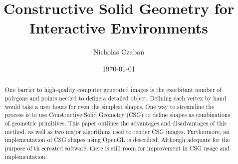 \documentclass[12pt]{article}
\begin{document}
\begin{titlepage}
\title{Constructive Solid Geometry for Interactive Environments}
\author{Nicholas Czaban}
\date{\today}
\maketitle
\begin{abstract}
  One barrier to high-quality computer generated images is the exorbitant number of polygons and points needed to define a detailed object. Defining each vertex by hand would take a user hours for even the simplest shapes. One way to streamline the process is to use Constructive Solid Geometry (CSG) to define shapes as combinations of geometric primitives. This paper outlines the advantages and disadvantages of this method, as well as two major algorithms used to render CSG images. Furthermore, an implementation of CSG shapes using OpenGL is described. Although adequate for the purpose of th ecreated software, there is still room for improvement in CSG usage and implementation.
\end{abstract}
\end{titlepage}
\begin{onehalfspace}
\tableofcontents
\listoffigures
\newpage
\end{onehalfspace}
\end{document}
